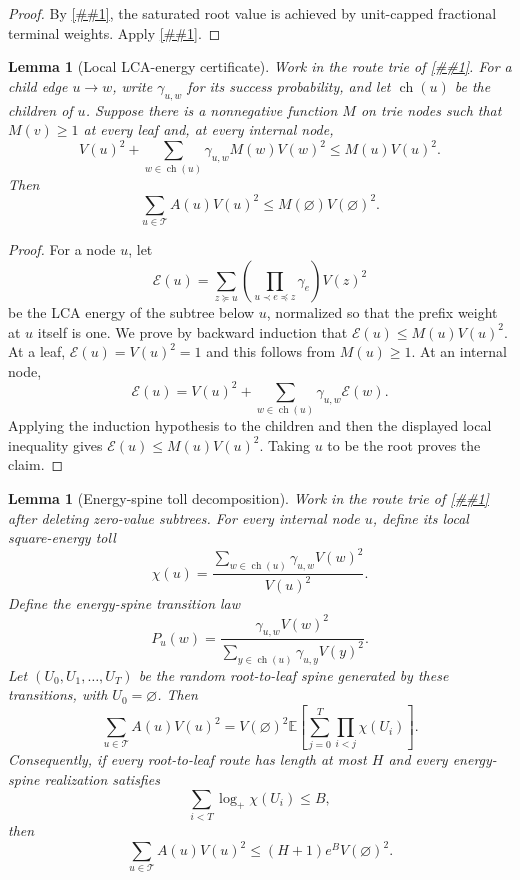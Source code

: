 \documentclass[10pt]{article}
\newcommand{\cref}[1]{\ref{##1}}
\newtheorem{lemma}[theorem]{Lemma}
\theoremstyle{definition}
\newcommand{\E}{\mathbb{E}}
\begin{document}
\begin{proof}
   By \cref{lem:saturated-value-recursion}, the saturated root value is
   achieved by unit-capped fractional terminal weights. Apply
   \cref{cor:capped-flow-delivery}.
\end{proof}

\begin{lemma}[Local LCA-energy certificate]\label{lem:local-lca-energy}
   Work in the route trie of \cref{lem:lca-value-flow}. For a child edge
   $u\to w$, write $\gamma_{u,w}$ for its success probability, and let
   $\operatorname{ch}(u)$ be the children of $u$. Suppose there is a
   nonnegative function $M$ on trie nodes such that $M(v)\ge1$ at every leaf
   and, at every internal node,
   \[
      V(u)^2+
      \sum_{w\in\operatorname{ch}(u)}
      \gamma_{u,w}M(w)V(w)^2
      \le
      M(u)V(u)^2 .
   \]
   Then
   \[
      \sum_{u\in\mathcal T}A(u)V(u)^2
      \le
      M(\varnothing)V(\varnothing)^2 .
   \]
\end{lemma}

\begin{proof}
   For a node $u$, let
   \[
      \mathcal E(u)=
      \sum_{z\succeq u}
      \left(\prod_{u\prec e\preceq z}\gamma_e\right)V(z)^2
   \]
   be the LCA energy of the subtree below $u$, normalized so that the prefix
   weight at $u$ itself is one. We prove by backward induction that
   $\mathcal E(u)\le M(u)V(u)^2$. At a leaf, $\mathcal E(u)=V(u)^2=1$ and this
   follows from $M(u)\ge1$. At an internal node,
   \[
      \mathcal E(u)=
      V(u)^2+
      \sum_{w\in\operatorname{ch}(u)}
      \gamma_{u,w}\mathcal E(w).
   \]
   Applying the induction hypothesis to the children and then the displayed
   local inequality gives $\mathcal E(u)\le M(u)V(u)^2$. Taking $u$ to be the
   root proves the claim.
\end{proof}

\begin{lemma}[Energy-spine toll decomposition]\label{lem:energy-spine-toll}
   Work in the route trie of \cref{lem:lca-value-flow} after deleting
   zero-value subtrees. For every internal node $u$, define its local
   square-energy toll
   \[
      \chi(u)=
      \frac{\sum_{w\in\operatorname{ch}(u)}
      \gamma_{u,w}V(w)^2}{V(u)^2}.
   \]
   Define the energy-spine transition law
   \[
      P_u(w)=
      \frac{\gamma_{u,w}V(w)^2}
           {\sum_{y\in\operatorname{ch}(u)}\gamma_{u,y}V(y)^2}.
   \]
   Let $(U_0,U_1,\ldots,U_T)$ be the random root-to-leaf spine generated by
   these transitions, with $U_0=\varnothing$. Then
   \[
      \sum_{u\in\mathcal T}A(u)V(u)^2
      =
      V(\varnothing)^2
      \E\left[
         \sum_{j=0}^{T}
         \prod_{i<j}\chi(U_i)
      \right].
   \]
   Consequently, if every root-to-leaf route has length at most $H$ and every
   energy-spine realization satisfies
   \[
      \sum_{i<T}\log_+\chi(U_i)\le B,
   \]
   then
   \[
      \sum_{u\in\mathcal T}A(u)V(u)^2
      \le
      (H+1)e^B V(\varnothing)^2 .
   \]
\end{lemma}
\end{document}
